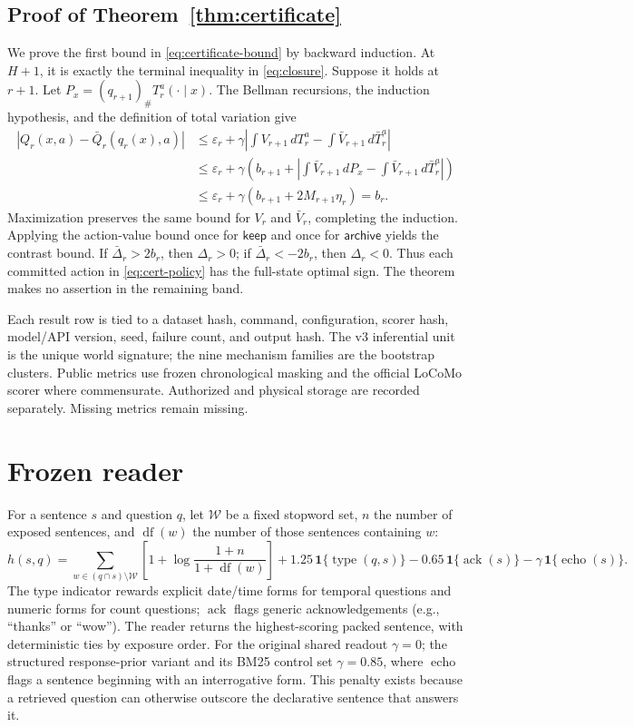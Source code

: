 \documentclass{article}
\newcommand{\keep}{\mathsf{keep}}
\newcommand{\archive}{\mathsf{archive}}
\begin{document}
\subsection{Proof of Theorem~\ref{thm:certificate}}
We prove the first bound in \eqref{eq:certificate-bound} by backward induction. At $H+1$, it is exactly the terminal inequality in \eqref{eq:closure}. Suppose it holds at $r+1$. Let $P_x=(q_{r+1})_\#T_r^a(\cdot\mid x)$. The Bellman recursions, the induction hypothesis, and the definition of total variation give
\begin{align}
|Q_r(x,a)-\bar Q_r(q_r(x),a)|
&\le\varepsilon_r+\gamma\left|\int V_{r+1}\,dT_r^a-\int\bar V_{r+1}\,d\bar T_r^a\right|\\
&\le\varepsilon_r+\gamma\left(b_{r+1}+\left|\int\bar V_{r+1}\,dP_x-\int\bar V_{r+1}\,d\bar T_r^a\right|\right)\\
&\le\varepsilon_r+\gamma\left(b_{r+1}+2M_{r+1}\eta_r\right)=b_r.
\end{align}
Maximization preserves the same bound for $V_r$ and $\bar V_r$, completing the induction. Applying the action-value bound once for $\keep$ and once for $\archive$ yields the contrast bound. If $\bar\Delta_r>2b_r$, then $\Delta_r>0$; if $\bar\Delta_r<-2b_r$, then $\Delta_r<0$. Thus each committed action in \eqref{eq:cert-policy} has the full-state optimal sign. The theorem makes no assertion in the remaining band.

Each result row is tied to a dataset hash, command, configuration, scorer hash, model/API version, seed, failure count, and output hash. The v3 inferential unit is the unique world signature; the nine mechanism families are the bootstrap clusters. Public metrics use frozen chronological masking and the official LoCoMo scorer where commensurate. Authorized and physical storage are recorded separately. Missing metrics remain missing.

\section{Frozen reader}
\label{app:reader}
For a sentence $s$ and question $q$, let $\mathcal{W}$ be a fixed stopword set,
$n$ the number of exposed sentences, and $\operatorname{df}(w)$ the number of
those sentences containing $w$:
\begin{equation}
h(s,q)=\sum_{w\in(q\cap s)\setminus\mathcal{W}}
\left[1+\log\frac{1+n}{1+\operatorname{df}(w)}\right]
+1.25\,\mathbf{1}\{\operatorname{type}(q,s)\}
-0.65\,\mathbf{1}\{\operatorname{ack}(s)\}
-\gamma\,\mathbf{1}\{\operatorname{echo}(s)\}.
\label{eq:answerability}
\end{equation}
The type indicator rewards explicit date/time forms for temporal questions and
numeric forms for count questions; $\operatorname{ack}$ flags generic
acknowledgements (e.g., ``thanks'' or ``wow''). The reader returns the
highest-scoring packed sentence, with deterministic ties by exposure order. For
the original shared readout $\gamma=0$; the structured response-prior variant and
its BM25 control set $\gamma=0.85$, where $\operatorname{echo}$ flags a sentence
beginning with an interrogative form. This penalty exists because a retrieved
question can otherwise outscore the declarative sentence that answers it.
\end{document}
